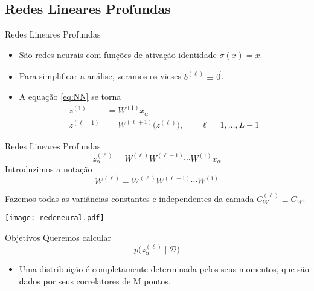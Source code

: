 \documentclass{beamer}
\newcommand{\WW}{\mathcal{W}}
\def\eell{{(\ell)}}
\begin{document}
\subsection{Redes Lineares Profundas}
\begin{frame}{Redes Lineares Profundas}
	\begin{itemize}
		\item São redes neurais com funções de ativação identidade $\sigma(x) = x$.
		\item Para simplificar a análise, zeramos os vieses $b^\eell \equiv \vec{0}$.
		\item A equação \eqref{eq:NN} se torna
		\begin{align*}
			z^{(1)} &= W^{(1)} x_\alpha \\ 	
			z^{(\ell+1)} &= W^{(\ell+1)}\big(z^\eell\big), \qquad \ell = 1, \ldots, L-1 
		\end{align*}
	\end{itemize}
\end{frame}
\begin{frame}{Redes Lineares Profundas}
	\begin{equation*}\tag{3.2}\label{eq:zele}
		z^\eell_\alpha = W^\eell W^{(\ell-1)}\cdots W^{(1)} x_\alpha
	\end{equation*}
Introduzimos a notação 
	\begin{equation*}\tag{3.3}\label{eq:Wcali}
		\WW^\eell = W^\eell W^{(\ell-1)}\cdots W^{(1)}
	\end{equation*}

Fazemos todas as variâncias constantes e independentes da camada $C_W^\eell \equiv C_W$. 
\end{frame}


\begin{frame}
	\texttt{[image: redeneural.pdf]}
\end{frame}


\begin{frame}{Objetivos}
	Queremos calcular 
	$$p\big(z^\eell_\alpha\mid \mathcal{D}\big) $$ 
\begin{itemize}
	\item 
	Uma distribuição é completamente determinada pelos seus momentos, que são dados por seus correlatores de M pontos.
\end{itemize}
\end{frame}
\end{document}

